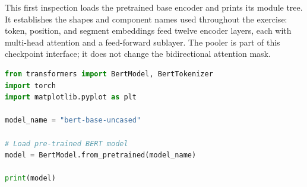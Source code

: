 \documentclass[../labs.tex]{subfiles}
\begin{document}
This first inspection loads the pretrained base encoder and prints its module tree. It establishes the shapes and component names used throughout the exercise: token, position, and segment embeddings feed twelve encoder layers, each with multi-head attention and a feed-forward sublayer. The pooler is part of this checkpoint interface; it does not change the bidirectional attention mask.


\begin{lstlisting}[language=Python,basicstyle=\ttfamily\scriptsize,breaklines=true,breakatwhitespace=false,columns=fullflexible,keepspaces=true,numbers=none]
from transformers import BertModel, BertTokenizer
import torch
import matplotlib.pyplot as plt

model_name = "bert-base-uncased"

# Load pre-trained BERT model
model = BertModel.from_pretrained(model_name)

print(model)
\end{lstlisting}

\hypertarget{out:lab03-bert-c01}{}\label{out:lab03-bert-c01}
\end{document}
